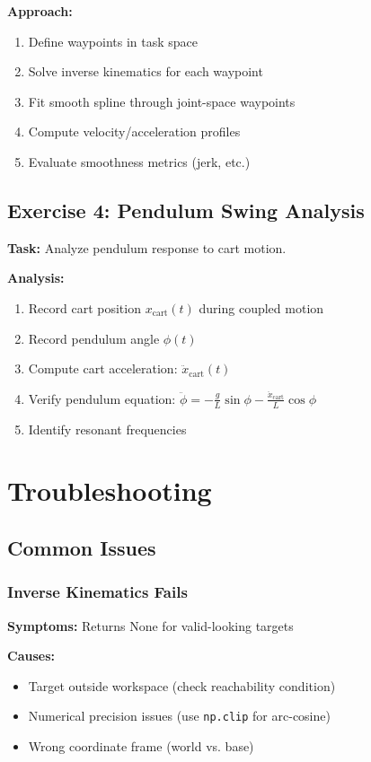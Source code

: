 \documentclass[11pt,a4paper]{article}
\begin{document}
\textbf{Approach:}
\begin{enumerate}
    \item Define waypoints in task space
    \item Solve inverse kinematics for each waypoint
    \item Fit smooth spline through joint-space waypoints
    \item Compute velocity/acceleration profiles
    \item Evaluate smoothness metrics (jerk, etc.)
\end{enumerate}

\subsection{Exercise 4: Pendulum Swing Analysis}

\textbf{Task:} Analyze pendulum response to cart motion.

\textbf{Analysis:}
\begin{enumerate}
    \item Record cart position $x_{\text{cart}}(t)$ during coupled motion
    \item Record pendulum angle $\phi(t)$
    \item Compute cart acceleration: $\ddot{x}_{\text{cart}}(t)$
    \item Verify pendulum equation: $\ddot{\phi} = -\frac{g}{L}\sin\phi - \frac{\ddot{x}_{\text{cart}}}{L}\cos\phi$
    \item Identify resonant frequencies
\end{enumerate}

\section{Troubleshooting}

\subsection{Common Issues}

\subsubsection{Inverse Kinematics Fails}

\textbf{Symptoms:} Returns None for valid-looking targets

\textbf{Causes:}
\begin{itemize}
    \item Target outside workspace (check reachability condition)
    \item Numerical precision issues (use \texttt{np.clip} for arc-cosine)
    \item Wrong coordinate frame (world vs. base)
\end{itemize}
\end{document}
